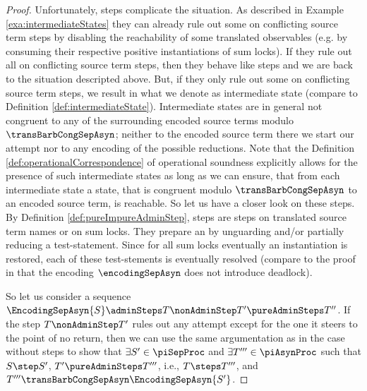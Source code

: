 \documentclass[]{llncs}
\begin{document}
\begin{proof}
	Unfortunately, \impure \admin steps complicate the situation. As described in Example \ref{exa:intermediateStates} they can already rule out some \simulations on conflicting source term steps by disabling the reachability of some translated observables (e.g. by consuming their respective positive instantiations of sum locks). If they rule out all \simulations on conflicting source term steps, then they behave like \nonAdmin steps and we are back to the situation descripted above. But, if they only rule out some \simulations on conflicting source term steps, we result in what we denote as intermediate state (compare to Definition \ref{def:intermediateState}). Intermediate states are in general not congruent to any of the surrounding encoded source terms modulo $ \transBarbCongSepAsyn $; neither to the encoded source term there we start our \simulation attempt nor to any encoding of the possible reductions. Note that the Definition \ref{def:operationalCorrespondence} of operational soundness explicitly allows for the presence of such intermediate states as long as we can ensure, that from each intermediate state a state, that is congruent modulo $ \transBarbCongSepAsyn $ to an encoded source term, is reachable. So let us have a closer look on these \impure \admin steps. By Definition \ref{def:pureImpureAdminStep}, \impure \admin steps are steps on translated source term names or on sum locks. They prepare an \simulation by unguarding and/or partially reducing a test-statement. Since for all sum locks eventually an instantiation is restored, each of these test-stements is eventually resolved (compare to the proof in \cite{nestmann00} that the encoding $ \encodingSepAsyn $ does not introduce deadlock).
	
	So let us consider a sequence $ \EncodingSepAsyn{S} \adminSteps T \nonAdminStep T' \pureAdminSteps T'' $. If the \nonAdmin step $ T \nonAdminStep T' $ rules out any \simulation attempt except for the one it steers to the point of no return, then we can use the same argumentation as in the case without \impure \admin steps to show that $ \exists S' \in \piSepProc $ and $ \exists T''' \in \piAsynProc $ such that $ S \step S' $, $ T' \pureAdminSteps T''' $, i.e., $ T \steps T''' $, and $ T''' \transBarbCongSepAsyn \EncodingSepAsyn{S'} $.
	

\end{proof}
\end{document}
